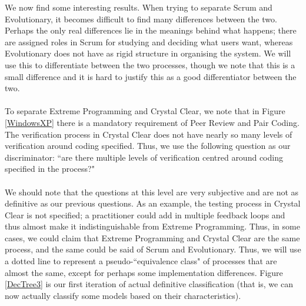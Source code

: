 We now find some interesting results.
When trying to separate Scrum and Evolutionary, it becomes difficult to find
many differences between the two.
Perhaps the only real differences lie in the meanings behind what happens; there
are assigned roles in Scrum for studying and deciding what users want, whereas
Evolutionary does not have as rigid structure in organising the system.
We will use this to differentiate between the two processes, though we note that
this is a small difference and it is hard to justify this as a good
differentiator between the two.\\
\\
To separate Extreme Programming and Crystal Clear, we note that in Figure
\ref{WindowsXP} there is a mandatory requirement of Peer Review and Pair Coding.
The verification process in Crystal Clear does not have nearly so many levels of
verification around coding specified.
Thus, we use the following question as our discriminator: ``are there multiple
levels of verification centred around coding specified in the process?"\\
\\
We should note that the questions at this level are very subjective and are not
as definitive as our previous questions.
As an example, the testing process in Crystal Clear is not specified; a
practitioner could add in multiple feedback loops and thus almost make it
indistinguishable from Extreme Programming.
Thus, in some cases, we could claim that Extreme Programming and Crystal Clear are the
same process, and the same could be said of Scrum and Evolutionary.
Thus, we will use a dotted line to represent a pseudo-``equivalence class" of
processes that are almost the same, except for perhaps some implementation
differences.
Figure \ref{DecTree3} is our first iteration of actual definitive classification
(that is, we can now actually classify some models based on their
characteristics).

